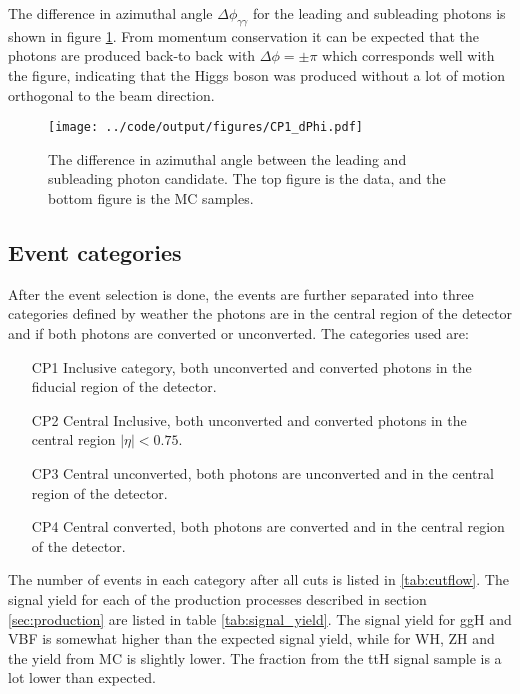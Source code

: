 \documentclass[10pt, aps, twocolumn, a4paper, nofootinbib]{revtex4}
\begin{document}
The difference in azimuthal angle $\Delta\phi_{\gamma\gamma}$ for the leading and subleading photons is shown in figure \ref{fig:dPhi_CP1}. From momentum conservation it can be expected that the photons are produced back-to back with $\Delta\phi = \pm \pi$ which corresponds well with the figure, indicating that the Higgs boson was produced without a lot of motion orthogonal to the beam direction. 

\begin{figure}
\texttt{[image: ../code/output/figures/CP1\_dPhi.pdf]}
\caption{The difference in azimuthal angle between the leading and subleading photon candidate. The top figure is the data, and the bottom figure is the MC samples. \label{fig:dPhi_CP1}}
\end{figure}

\subsection{Event categories}
After the event selection is done, the events are further separated into three categories defined by weather the photons are in the central region of the detector and if both photons are converted or unconverted. The categories used are: 

\begin{itemize}
\itemsep0em 
\item[CP1] Inclusive category, both unconverted and converted photons in the fiducial region of the detector. 
\item[CP2] Central Inclusive, both unconverted and converted photons in the central region $|\eta|<0.75$.
\item[CP3] Central unconverted, both photons are unconverted and in the central region of the detector.
\item[CP4] Central converted, both photons are converted and in the central region of the detector.
\end{itemize}

The number of events in each category after all cuts is listed in \ref{tab:cutflow}. The signal yield for each of the production processes described in section \ref{sec:production} are listed in table \ref{tab:signal_yield}. The signal yield for ggH and VBF is somewhat higher than the expected signal yield, while for WH, ZH and the yield from MC is slightly lower. The fraction from the ttH signal sample is a lot lower than expected. 
\end{document}
